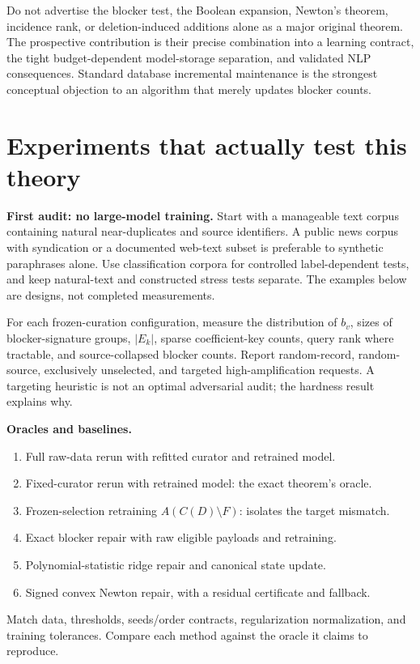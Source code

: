 \documentclass[11pt,a4paper]{article}
\theoremstyle{definition}\newtheorem{definition}[theorem]{Definition}
\newcommand{\minus}{\setminus}
\begin{document}
Do not advertise the blocker test, the Boolean expansion, Newton's theorem, incidence rank, or deletion-induced additions alone as a major original theorem. The prospective contribution is their precise combination into a learning contract, the tight budget-dependent model-storage separation, and validated NLP consequences. Standard database incremental maintenance is the strongest conceptual objection to an algorithm that merely updates blocker counts.

\section{Experiments that actually test this theory}
\textbf{First audit: no large-model training.} Start with a manageable text corpus containing natural near-duplicates and source identifiers. A public news corpus with syndication or a documented web-text subset is preferable to synthetic paraphrases alone. Use classification corpora for controlled label-dependent tests, and keep natural-text and constructed stress tests separate. The examples below are designs, not completed measurements.

For each frozen-curation configuration, measure the distribution of $b_v$, sizes of blocker-signature groups, $|E_k|$, sparse coefficient-key counts, query rank where tractable, and source-collapsed blocker counts. Report random-record, random-source, exclusively unselected, and targeted high-amplification requests. A targeting heuristic is not an optimal adversarial audit; the hardness result explains why.

\textbf{Oracles and baselines.}
\begin{enumerate}
\item Full raw-data rerun with refitted curator and retrained model.
\item Fixed-curator rerun with retrained model: the exact theorem's oracle.
\item Frozen-selection retraining $A(C(D)\minus F)$: isolates the target mismatch.
\item Exact blocker repair with raw eligible payloads and retraining.
\item Polynomial-statistic ridge repair and canonical state update.
\item Signed convex Newton repair, with a residual certificate and fallback.
\end{enumerate}
Match data, thresholds, seeds/order contracts, regularization normalization, and training tolerances. Compare each method against the oracle it claims to reproduce.
\end{document}
